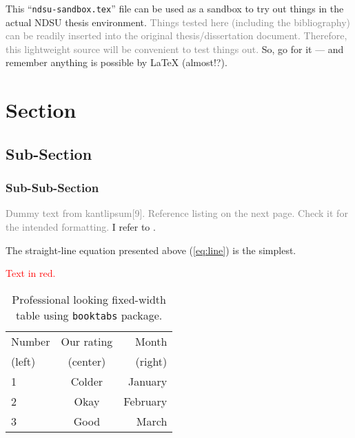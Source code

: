
\checkBeginRefsection%

This ``\texttt{ndsu-sandbox.tex}'' file can be used as a sandbox to try out things in the actual NDSU thesis environment. \textcolor{gray}{Things tested here (including the bibliography) can be readily inserted into the original thesis/dissertation document. Therefore, this lightweight source will be convenient to test things out.} So, go for it --- and remember anything is possible by \LaTeX{} (almost!?).

\section{Section}
\subsection{Sub-Section}
\subsubsection{Sub-Sub-Section}

\textcolor{gray}{Dummy text from kantlipsum[9]. Reference listing on the next page. Check it for the intended formatting.} I refer to \citep{lamport94,kopka2004guide,baczkowski1990ndsu}. 


The straight-line equation presented above (\cref{eq:line}) is the simplest.

\kant[9]

\textcolor{red}{Text in red.}

\begin{table}[ht]
\centering
\caption{Professional looking fixed-width table using 
\texttt{booktabs} package.}
\begin{tabular}{ l c r }
\toprule
Number & Our rating & Month \\
(left) & (center)   & (right)\\
\midrule
1 & Colder & January \\
2 & Okay   & February \\
3 & Good   & March\\
\bottomrule
\end{tabular}
\label{tab22}
\end{table}

\kant[9]

